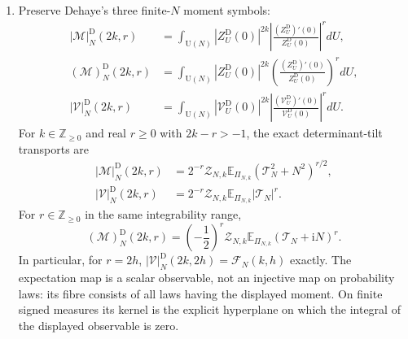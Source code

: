 \begin{theorem}
\begin{enumerate}
 \item Preserve Dehaye's three finite-$N$ moment symbols:
 \begin{align}
  |\mathcal M|_N^{\mathrm D}(2k,r)
  &=\int_{\mathrm U(N)}|Z_U^{\mathrm D}(0)|^{2k}
    \left|\frac{(Z_U^{\mathrm D})'(0)}{Z_U^{\mathrm D}(0)}\right|^r dU,
  \label{eq:dehaye-absolute-M-definition}\\
  (\mathcal M)_N^{\mathrm D}(2k,r)
  &=\int_{\mathrm U(N)}|Z_U^{\mathrm D}(0)|^{2k}
    \left(\frac{(Z_U^{\mathrm D})'(0)}{Z_U^{\mathrm D}(0)}\right)^r dU,
  \label{eq:dehaye-complex-M-definition}\\
  |\mathcal V|_N^{\mathrm D}(2k,r)
  &=\int_{\mathrm U(N)}|\mathcal V_U^{\mathrm D}(0)|^{2k}
    \left|\frac{(\mathcal V_U^{\mathrm D})'(0)}
    {\mathcal V_U^{\mathrm D}(0)}\right|^r dU.
  \label{eq:dehaye-absolute-V-definition}
 \end{align}
 For $k\in\mathbb Z_{\geq0}$ and real $r\geq0$ with $2k-r>-1$, the
 exact determinant-tilt transports are
 \begin{align}
  |\mathcal M|_N^{\mathrm D}(2k,r)
  &=2^{-r}\mathcal Z_{N,k}
    \mathbb E_{\Pi_{N,k}}(\mathcal T_N^2+N^2)^{r/2},
  \label{eq:dehaye-absolute-M-trace}\\
  |\mathcal V|_N^{\mathrm D}(2k,r)
  &=2^{-r}\mathcal Z_{N,k}
    \mathbb E_{\Pi_{N,k}}|\mathcal T_N|^r.
  \label{eq:dehaye-absolute-V-trace}
 \end{align}
 For $r\in\mathbb Z_{\geq0}$ in the same integrability range,
 \begin{equation}
  (\mathcal M)_N^{\mathrm D}(2k,r)
  =\left(-\frac12\right)^r\mathcal Z_{N,k}
   \mathbb E_{\Pi_{N,k}}(\mathcal T_N+\mathrm iN)^r.
  \label{eq:dehaye-complex-M-trace}
 \end{equation}
 In particular, for $r=2h$,
 $|\mathcal V|_N^{\mathrm D}(2k,2h)=\mathcal F_N(k,h)$ exactly.
 The expectation map is a scalar observable, not an injective map on probability
 laws: its fibre consists of all laws having the displayed moment.  On finite signed
 measures its kernel is the explicit hyperplane on which the integral of the displayed
 observable is zero.
\end{enumerate}
\end{theorem}


